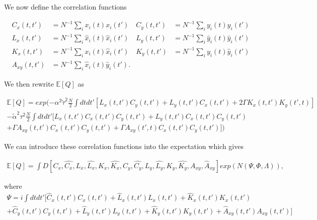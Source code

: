 \documentclass{article}
\begin{document}
	We now define the correlation functions

		\begin{align*}
C_x(t, t') &= N^{-1} \sum_i x_i(t) x_i(t') & C_y(t, t') &= N^{-1} \sum_i y_i(t) y_i(t')\\
L_x(t, t') &= N^{-1} \sum_i \hat{x}_i(t) \hat{x}_i(t') & L_y(t, t') &= N^{-1} \sum_i \hat{y}_i(t) \hat{y}_i(t') \\
K_x(t, t') &= N^{-1} \sum_i x_i(t) \hat{x}_i(t') & K_y(t, t') &= N^{-1} \sum_i y_i(t) \hat{y}_i(t')\\
A_{xy}(t, t') &= N^{-1} \sum_i \hat{x}_i(t) \hat{y}_i(t').
\end{align*}

We then rewrite $\mathbb{E}[Q]$ as 

\begin{equation}
\begin{split}
		\mathbb{E}[Q] = exp(- \alpha^2 \tilde{\tau}^2 \frac{N}{2} \int dt dt'[L_x(t, t')C_y(t, t')
		+ L_y(t, t')C_x(t, t') + 2 \Gamma K_x(t, t') K_y(t', t)] \\
	- \tilde{\alpha}^2 \tau^2 \frac{N}{2} \int dtdt' [L_x(t, t') C_x(t, t') C_y(t, t') + L_y(t, t')
	C_x(t, t') C_y(t, t') \\ + \Gamma A_{xy}(t, t') C_x(t, t') C_y(t, t') + \Gamma A_{xy}(t', t) C_x
	(t, t') C_y(t, t')] )
\end{split}
\end{equation}

We can introduce these correlation functions into the expectation which gives

\begin{equation}
	\begin{split}
		\mathbb{E}[Q] = \int D[C_x, \hat{C_x}, L_x, \hat{L_x}, K_x, 
		\hat{K_x}, C_y, \hat{C_y}, L_y, \hat{L_y}, K_y, 
		\hat{K_y}, A_{xy}, \hat{A}_{xy}] 
		exp(N(\Psi, \Phi, \Lambda)),
	\end{split}
\end{equation}

where
\begin{equation}
	\begin{split}
	\Psi = i \int dtdt' [\hat{C}_x(t, t') C_x(t, t') + \hat{L}_x(t, t') L_x(t, t') + \hat{K}_x
		(t, t') K_x(t, t') \\ + \hat{C}_y(t, t') C_y(t, t') + \hat{L}_y(t, t') L_y(t, t') + 
		\hat{K}_y(t, t') K_y(t, t') + \hat{A}_{xy}(t, t') A_{xy}(t, t')]
	\end{split}
\end{equation}
\end{document}
